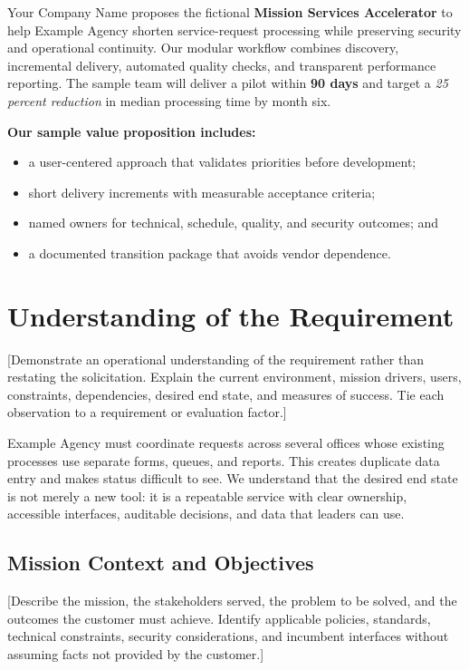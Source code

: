 Your Company Name proposes the fictional \textbf{Mission Services Accelerator}
to help Example Agency shorten service-request processing while preserving
security and operational continuity. Our modular workflow combines discovery,
incremental delivery, automated quality checks, and transparent performance
reporting. The sample team will deliver a pilot within \textbf{90 days} and
target a \emph{25 percent reduction} in median processing time by month six.

\noindent
\textbf{Our sample value proposition includes:}
\begin{itemize}
    \item a user-centered approach that validates priorities before development;
    \item short delivery increments with measurable acceptance criteria;
    \item named owners for technical, schedule, quality, and security outcomes; and
    \item a documented transition package that avoids vendor dependence.
\end{itemize}

\section{Understanding of the Requirement}
\label{sec:understanding}
[Demonstrate an operational understanding of the requirement rather than
restating the solicitation. Explain the current environment, mission drivers,
users, constraints, dependencies, desired end state, and measures of success.
Tie each observation to a requirement or evaluation factor.]

Example Agency must coordinate requests across several offices whose existing
processes use separate forms, queues, and reports. This creates duplicate data
entry and makes status difficult to see. We understand that the desired end
state is not merely a new tool: it is a repeatable service with clear ownership,
accessible interfaces, auditable decisions, and data that leaders can use.

\subsection{Mission Context and Objectives}
[Describe the mission, the stakeholders served, the problem to be solved, and
the outcomes the customer must achieve. Identify applicable policies,
standards, technical constraints, security considerations, and incumbent
interfaces without assuming facts not provided by the customer.]

